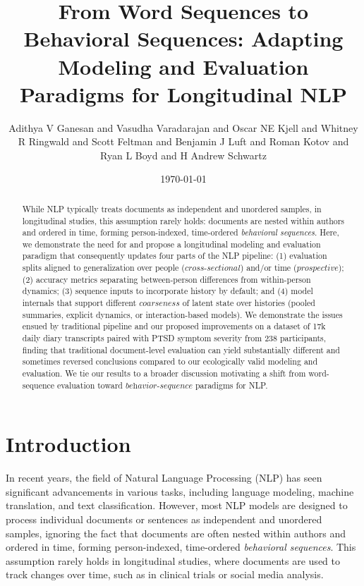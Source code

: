 \documentclass[12pt]{article}
\begin{document}
\begin{titlepage}
\title{From Word Sequences to Behavioral Sequences: Adapting Modeling and Evaluation Paradigms for Longitudinal NLP}
\author{Adithya V Ganesan and Vasudha Varadarajan and Oscar NE Kjell and Whitney R Ringwald and Scott Feltman and Benjamin J Luft and Roman Kotov and Ryan L Boyd and H Andrew Schwartz}
\date{\today}
\end{titlepage}
\maketitle
\begin{abstract}
While NLP typically treats documents as independent and unordered samples, in longitudinal studies, this assumption rarely holds: documents are nested within authors and ordered in time, forming person-indexed, time-ordered \textit{behavioral sequences}. Here, we demonstrate the need for and propose a longitudinal modeling and evaluation paradigm that consequently updates four parts of the NLP pipeline: (1) evaluation splits aligned to generalization over people ($\textit{cross-sectional}$) and/or time ($\textit{prospective}$); (2) accuracy metrics separating between-person differences from within-person dynamics; (3) sequence inputs to incorporate history by default; and (4) model internals that support different $\textit{coarseness}$ of latent state over histories (pooled summaries, explicit dynamics, or interaction-based models). We demonstrate the issues ensued by traditional pipeline and our proposed improvements on a dataset of 17k daily diary transcripts paired with PTSD symptom severity from 238 participants, finding that traditional document-level evaluation can yield substantially different and sometimes reversed conclusions compared to our ecologically valid modeling and evaluation. We tie our results to a broader discussion motivating a shift from word-sequence evaluation toward $\textit{behavior-sequence}$ paradigms for NLP.
\end{abstract}
\section{Introduction}
\label{sec:intro}
In recent years, the field of Natural Language Processing (NLP) has seen significant advancements in various tasks, including language modeling, machine translation, and text classification. However, most NLP models are designed to process individual documents or sentences as independent and unordered samples, ignoring the fact that documents are often nested within authors and ordered in time, forming person-indexed, time-ordered \textit{behavioral sequences}. This assumption rarely holds in longitudinal studies, where documents are used to track changes over time, such as in clinical trials or social media analysis.
\end{document}
